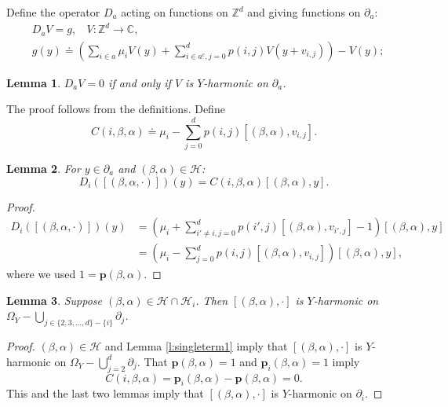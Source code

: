 \documentclass[11pt,a4paper]{article}
\newtheorem{lemma}{Lemma}
\begin{document}
Define the operator $D_a$ acting on functions on 
${\mathbb Z}^d$ and giving functions on $\partial_a$:
\begin{align*}
&D_aV = g,~~~~ V: {\mathbb Z}^d \rightarrow {\mathbb C},\\
& g( y)
\doteq
\left(\sum_{i \in a} \mu_i V(y)  +  
\sum_{ i\in a^c, j=0}^d p(i,j) V( y + v_{i,j}) \right)
- V(y);
\end{align*}
\begin{lemma}\label{l:Daeq0}
 $D_a V = 0$ 
if and only if $V$ is $Y$-harmonic on $\partial_a$.
\end{lemma}
The proof follows from the definitions.
Define
\begin{equation}\label{e:Cjbetaalpha}
C(i,\beta,\alpha) \doteq 
\mu_i
-\sum_{j=0}^d p(i,j) [ (\beta,\alpha),v_{i,j} ].
\end{equation}
\begin{lemma}
For $y \in \partial_a$ and $(\beta,\alpha) \in {\mathcal H}$:
\begin{equation}\label{e:imageofD2shortgd}
D_i( [(\beta,\alpha,\cdot)])(y) =C(i,\beta,\alpha) [(\beta,\alpha),y].
\end{equation}
\end{lemma}
\begin{proof}
\begin{align*}
D_i( [(\beta,\alpha,\cdot)])(y) &=
\left( \mu_i
+\sum_{i'\neq i, j=0}^d p(i',j) [ (\beta,\alpha),v_{i',j} ]  -1\right) 
[ (\beta,\alpha), y]\\
&=
\left( \mu_i
-\sum_{ j=0}^d p(i,j) [ (\beta,\alpha),v_{i,j} ] \right) 
[ (\beta,\alpha), y],
\end{align*}
where we used $1={\mathbf p}(\beta,\alpha)$.
\end{proof}


\begin{lemma}\label{l:singleterm2}
Suppose $(\beta,\alpha) \in {\mathcal H} \cap {\mathcal H}_i$. Then
$[(\beta,\alpha),\cdot]$ is $Y$-harmonic on 
$\Omega_Y-\bigcup_{j \in \{2,3,...,d\} - \{i\}} \partial_j$.
\end{lemma}
\begin{proof}
$(\beta,\alpha) \in {\mathcal H}$ and Lemma \ref{l:singleterm1} imply
that $[(\beta,\alpha),\cdot]$ is $Y$-harmonic on 
$\Omega_Y-\bigcup_{j=2}^d \partial_j.$
That ${\mathbf p}(\beta,\alpha) = 1$ and ${\mathbf p}_i(\beta,\alpha) =1$
imply
\[
C(i,\beta,\alpha) = 
{\mathbf p}_i(\beta,\alpha)-{\mathbf p}(\beta,\alpha) =0.
\]
This and the last two lemmas imply that $[(\beta,\alpha),\cdot ]$ is
$Y$-harmonic on $\partial_i.$
\end{proof}
\end{document}
